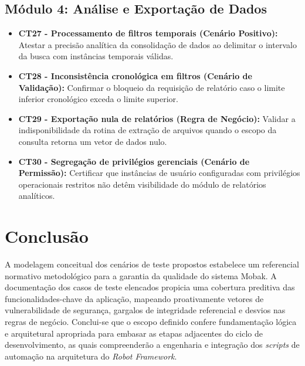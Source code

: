 \documentclass[12pt,a4paper]{article}
\begin{document}
\subsection{Módulo 4: Análise e Exportação de Dados}
\begin{itemize}[leftmargin=*]
    \item \textbf{CT27 - Processamento de filtros temporais (Cenário Positivo):} Atestar a precisão analítica da consolidação de dados ao delimitar o intervalo da busca com instâncias temporais válidas.
    \item \textbf{CT28 - Inconsistência cronológica em filtros (Cenário de Validação):} Confirmar o bloqueio da requisição de relatório caso o limite inferior cronológico exceda o limite superior.
    \item \textbf{CT29 - Exportação nula de relatórios (Regra de Negócio):} Validar a indisponibilidade da rotina de extração de arquivos quando o escopo da consulta retorna um vetor de dados nulo.
    \item \textbf{CT30 - Segregação de privilégios gerenciais (Cenário de Permissão):} Certificar que instâncias de usuário configuradas com privilégios operacionais restritos não detêm visibilidade do módulo de relatórios analíticos.
\end{itemize}

\section{Conclusão}
A modelagem conceitual dos cenários de teste propostos estabelece um referencial normativo metodológico para a garantia da qualidade do sistema Mobak. A documentação dos casos de teste elencados propicia uma cobertura preditiva das funcionalidades-chave da aplicação, mapeando proativamente vetores de vulnerabilidade de segurança, gargalos de integridade referencial e desvios nas regras de negócio. Conclui-se que o escopo definido confere fundamentação lógica e arquitetural apropriada para embasar as etapas adjacentes do ciclo de desenvolvimento, as quais compreenderão a engenharia e integração dos \textit{scripts} de automação na arquitetura do \textit{Robot Framework}.
\end{document}
